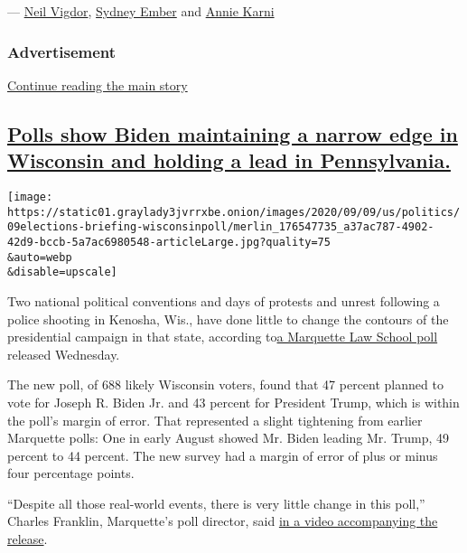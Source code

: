 --- \href{https://www.nytimes3xbfgragh.onion/by/neil-vigdor}{Neil
Vigdor},
\href{https://www.nytimes3xbfgragh.onion/by/sydney-ember}{Sydney Ember}
and \href{https://www.nytimes3xbfgragh.onion/by/annie-karni}{Annie
Karni}

\hypertarget{advertisement-2}{%
\subsubsection{Advertisement}\label{advertisement-2}}

\protect\hyperlink{after-dfp-ad-mid3}{Continue reading the main story}

\hypertarget{polls-show-biden-maintaining-a-narrow-edge-in-wisconsin-and-holding-a-lead-in-pennsylvania}{%
\subsection{\texorpdfstring{\protect\hyperlink{polls-show-biden-maintaining-a-narrow-edge-in-wisconsin-and-holding-a-lead-in-pennsylvania}{Polls
show Biden maintaining a narrow edge in Wisconsin and holding a lead in
Pennsylvania.}}{Polls show Biden maintaining a narrow edge in Wisconsin and holding a lead in Pennsylvania.}}\label{polls-show-biden-maintaining-a-narrow-edge-in-wisconsin-and-holding-a-lead-in-pennsylvania}}

\texttt{[image: https://static01.graylady3jvrrxbe.onion/images/2020/09/09/us/politics/09elections-briefing-wisconsinpoll/merlin\_176547735\_a37ac787-4902-42d9-bccb-5a7ac6980548-articleLarge.jpg?quality=75\\\&auto=webp\\\&disable=upscale]}

Two national political conventions and days of protests and unrest
following a police shooting in Kenosha, Wis., have done little to change
the contours of the presidential campaign in that state, according
to\href{https://law.marquette.edu/poll/}{a Marquette Law School poll}
released Wednesday.

The new poll, of 688 likely Wisconsin voters, found that 47 percent
planned to vote for Joseph R. Biden Jr. and 43 percent for President
Trump, which is within the poll's margin of error. That represented a
slight tightening from earlier Marquette polls: One in early August
showed Mr. Biden leading Mr. Trump, 49 percent to 44 percent. The new
survey had a margin of error of plus or minus four percentage points.

``Despite all those real-world events, there is very little change in
this poll,'' Charles Franklin, Marquette's poll director, said
\href{https://www.youtube.com/watch?v=qd5LNhdapy0\&feature=youtu.be}{in
a video accompanying the release}.

